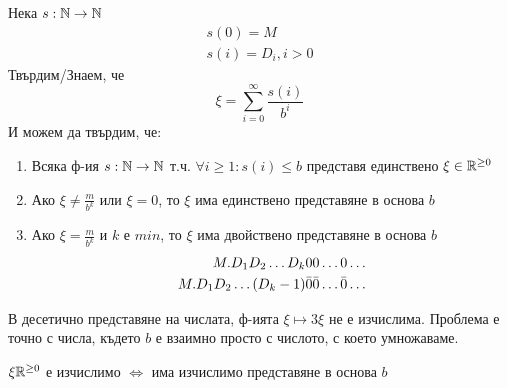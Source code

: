 \begin{proposition}
    Нека $s: {\mathbb{N}} \to {\mathbb{N}}$
    \begin{equation*}
        \begin{split}
            s(0) = M \\
            s(i) = D_i, i > 0
        \end{split}
    \end{equation*}
    Твърдим/Знаем, че
    \begin{equation*}
        \xi = \sum\limits_{i=0}^{\infty} \frac{s(i)}{b^i}
    \end{equation*}
    И можем да твърдим, че:
    \begin{enumerate}
        \item Всяка ф-ия $s: {\mathbb{N}} \to {\mathbb{N}}$ т.ч. $\forall i \geq 1: s(i) \leq b$ представя единствено $\xi \in {\mathbb{R}}^{\geq 0}$
        \item Ако $\xi \neq \frac{m}{b^k}$ или $\xi = 0$, то $\xi$ има единствено представяне в основа $b$
        \item Ако $\xi = \frac{m}{b^k}$ и $k$ е $min$, то $\xi$ има двойствено представяне в основа $b$
        \begin{equation*}
            \begin{split}
                M.D_1 D_2 \dots D_k 00\dots 0\dots\\
                M.D_1 D_2 \dots (D_k - 1) \Bar{0} \Bar{0} \dots \Bar{0} \dots
            \end{split}
        \end{equation*}
    \end{enumerate}
\end{proposition}
\begin{example}
    В десетично представяне на числата, ф-ията $\xi \mapsto 3\xi$ не е изчислима. Проблема е точно с числа, където $b$ е взаимно просто с числото, с което умножаваме.
\end{example}
\begin{proposition}
    $\xi {\mathbb{R}}^{\geq 0}$ е изчислимо $\iff$ има изчислимо представяне в основа $b$
\end{proposition}
